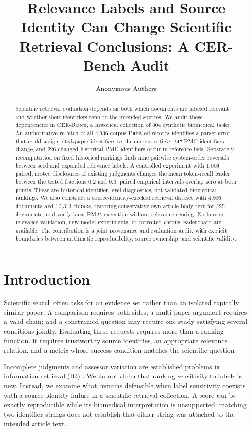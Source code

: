 \documentclass{article}
\title{Relevance Labels and Source Identity Can Change Scientific Retrieval Conclusions: A CER-Bench Audit}
\author{Anonymous Authors}
\newcommand{\cer}{\textsc{CER-Bench}\xspace}
\begin{document}
\maketitle

\begin{abstract}
Scientific retrieval evaluation depends on both which documents are labeled relevant and whether their identifiers refer to the intended sources. We audit these dependencies in \cer, a historical collection of 304 synthetic biomedical tasks. An authoritative re-fetch of all 4,936 corpus PubMed records identifies a parser error that could assign cited-paper identifiers to the current article: 247 PMC identifiers change, and 226 changed historical PMC identifiers occur in reference lists. Separately, recomputation on fixed historical rankings finds nine pairwise system-order reversals between seed and expanded relevance labels. A controlled experiment with 1,000 paired, nested disclosures of existing judgments changes the mean token-recall leader between the tested fractions 0.2 and 0.3; paired empirical intervals overlap zero at both points. These are historical identifier-level diagnostics, not validated biomedical rankings. We also construct a source-identity-checked retrieval dataset with 4,936 documents and 10,313 chunks, restoring conservative own-article body text for 525 documents, and verify local BM25 execution without relevance scoring. No human relevance validation, new model experiments, or corrected-corpus leaderboard are available. The contribution is a joint provenance and evaluation audit, with explicit boundaries between arithmetic reproducibility, source ownership, and scientific validity.
\end{abstract}

\section{Introduction}
Scientific search often asks for an evidence set rather than an isolated topically similar paper. A comparison requires both sides; a multi-paper argument requires a valid chain; and a constrained question may require one study satisfying several conditions jointly. Evaluating these requests requires more than a ranking function. It requires trustworthy source identities, an appropriate relevance relation, and a metric whose success condition matches the scientific question.

Incomplete judgments and assessor variation are established problems in information retrieval (IR) \citep{buckley2004incomplete,voorhees2000judgments}. We do not claim that ranking sensitivity to labels is new. Instead, we examine what remains defensible when label sensitivity coexists with a source-identity failure in a scientific retrieval collection. A score can be exactly reproducible while its biomedical interpretation is unsupported: matching two identifier strings does not establish that either string was attached to the intended article text.
\end{document}

